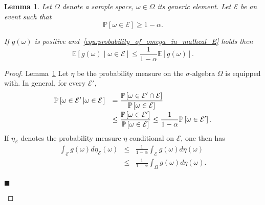\documentclass[10pt,twocolumn,twoside]{IEEEtran}					%
\newcounter{generalCounter}
\theoremstyle	{plain}
\newtheorem		{lemma}			[generalCounter]	{Lemma}
\newcommand{\Probability}			[0]	{\mathbb{P}}
\newcommand{\ProbabilityOf}			[1]	{\Probability \left[ #1 \right]}
\newcommand{\Expectation}					[0]	{\mathbb{E}}
\newcommand{\ExpectationOf}					[1]	{\Expectation \left[ #1 \right]}
\begin{document}
\begin{lemma}
	Let $\Omega$ denote a sample space, $\omega \in \Omega$ its generic element. Let $\mathcal{E}$ be an event such that 
	\begin{equation}
		\ProbabilityOf{ \omega \in \mathcal{E} } \geq 1 - \alpha.
		\label{equ:probability_of_omega_in_mathcal_E}
	\end{equation}

	If $g(\omega)$ is positive and~\eqref{equ:probability_of_omega_in_mathcal_E} holds then
	\begin{equation}
		\ExpectationOf{ g(\omega) \; \left| \; \omega \in \mathcal{E} \right. }
		\leq 
		\frac{1}{1 - \alpha} \ExpectationOf{ g(\omega) } .
		\label{equ:conditional_expectation_on_mathcal_E}
	\end{equation}
	\label{thm:conditional_expectation_on_mathcal_E}
\end{lemma}
%
\begin{proof}{Lemma~\ref{thm:conditional_expectation_on_mathcal_E}}
	Let $\eta$ be the probability measure on the $\sigma$-algebra $\Omega$ is equipped with. In general, for every $\mathcal{E}'$,
	\begin{equation}
		\begin{array}{ll}
		\ProbabilityOf{ \omega \in \mathcal{E}' \left| \omega \in \mathcal{E} \right. }
		& = \displaystyle
		\frac{\ProbabilityOf{ \omega \in \mathcal{E}' \cap \mathcal{E} }}{ \ProbabilityOf{ \omega \in \mathcal{E} }} \vspace{0.1cm} \\
		& \leq \displaystyle
		\frac{\ProbabilityOf{ \omega \in \mathcal{E}' }}{ \ProbabilityOf{ \omega \in \mathcal{E} }}
		\leq
		\frac{1}{1 - \alpha} \ProbabilityOf{ \omega \in \mathcal{E}' } .
		\end{array}
		\label{equ:minoration_of_mathcal_e_prime}
	\end{equation}
	If $\eta_{\mathcal{E}}$ denotes the probability measure $\eta$ conditional on $\mathcal{E}$, 
	one then has
	\begin{eqnarray}
		\int_{\mathcal{E}} g(\omega) d\eta_{\mathcal{E}}(\omega)
		& \leq &
		\frac{1}{1-\alpha} \int_{\mathcal{E}} g(\omega) d\eta(\omega) \\
		& \leq &
		\frac{1}{1-\alpha} \int_{\Omega} g(\omega) d\eta(\omega) . \\
	\end{eqnarray}
	\begin{flushright}
$\blacksquare$
\end{flushright}
\end{proof}
\end{document}
